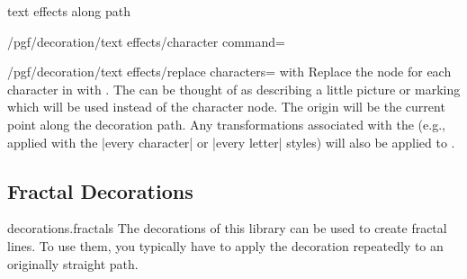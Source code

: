 \begin{decoration}{text effects along path}
\begin{key}{/pgf/decoration/text effects/character command=}
\begin{codeexample}[preamble={\usetikzlibrary{decorations.text}}]
\end{codeexample}
    \end{key}

    \begin{key}{/pgf/decoration/text effects/replace characters= with }
        Replace the node for each character in  with
        . The  can be thought of as describing a little
        picture or marking which will be used instead of the character node.
        The origin will be the current point along the decoration path. Any
        transformations associated with the  (e.g., applied
        with the |every character| or |every letter| styles) will also be
        applied to .
\begin{codeexample}[preamble={\usetikzlibrary{decorations.text}}]
\end{codeexample}
    \end{key}
\end{decoration}


\subsection{Fractal Decorations}

\begin{pgflibrary}{decorations.fractals}
    The decorations of this library can be used to create fractal lines. To use
    them, you typically have to apply the decoration repeatedly to an
    originally straight path.
\end{pgflibrary}

